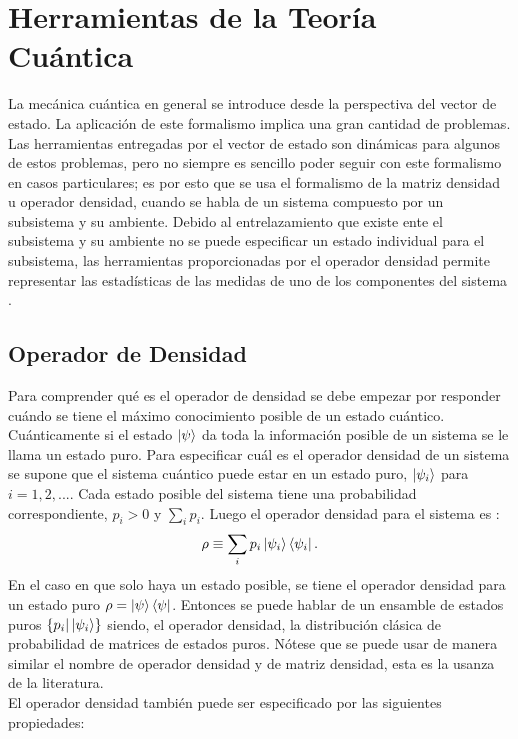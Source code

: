 \section{Herramientas de la Teoría Cuántica}
La mecánica cuántica en general se introduce desde la perspectiva del vector de estado. La aplicación de este formalismo implica una gran cantidad de problemas. Las herramientas entregadas por el vector de estado son dinámicas para algunos de estos problemas, pero no siempre es sencillo poder seguir con este formalismo en casos particulares; es por esto que se usa el formalismo de la matriz densidad u operador densidad, cuando se habla de un sistema compuesto por un subsistema y su ambiente. Debido al entrelazamiento que existe ente el subsistema y su ambiente no se puede especificar un estado individual para el subsistema, las herramientas proporcionadas por el operador densidad permite representar las estadísticas de las medidas de uno de los componentes del sistema \cite{Decoherence}.
\\

\subsection{Operador de Densidad}
Para comprender qué es el operador de densidad se debe empezar por responder cuándo se tiene el máximo conocimiento posible de un estado cuántico. Cuánticamente si el estado $\ket{\psi}$ da toda la información posible de un sistema se le llama un estado puro. Para especificar cuál es el operador densidad de un sistema se supone que el sistema cuántico puede estar en un estado puro, $\ket{\psi_{i}}$ para $i=1,2,...$. Cada estado posible del sistema tiene una probabilidad correspondiente, $p_{i}>0$ y $\sum_{i} p_{i}$. Luego el operador densidad para el sistema es :
\begin{equation}
\rho \equiv \sum_{i} p_{i} \ket{\psi_{i}}\bra{\psi_{i}}.
\end{equation}
En el caso en que solo haya un estado posible, se tiene el operador densidad para un estado puro $\rho= \ket{\psi}\bra{\psi}$. Entonces se puede hablar de un ensamble de estados puros $ \{ p_{i} | \ket{\psi_{i}} \} $  siendo, el operador densidad, la distribución clásica de probabilidad de matrices de estados puros. Nótese que se puede usar de manera similar el nombre de operador densidad y de matriz densidad, esta es la usanza de la literatura. 
\\
El operador densidad también puede ser especificado por las siguientes propiedades: 

